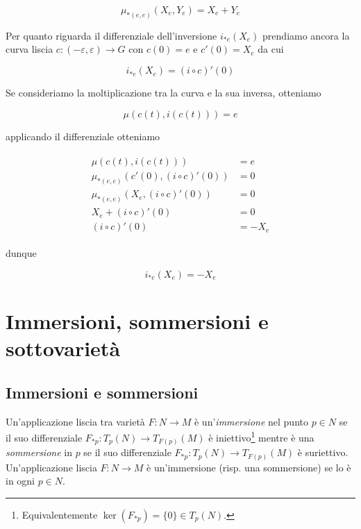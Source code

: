 \begin{equation}
	\mu_{*(e,e)}(X_{e},Y_{e}) = X_{e} + Y_{e}
\end{equation}

Per quanto riguarda il differenziale dell'inversione $ i_{*e}(X_{e}) $ prendiamo ancora la curva liscia $ c : (-\varepsilon,\varepsilon) \to G $ con $ c(0)=e $ e $ c'(0) = X_{e} $ da cui

\begin{equation}
	i_{*e}(X_{e}) = (i \circ c)'(0)
\end{equation}

Se consideriamo la moltiplicazione tra la curva e la sua inversa, otteniamo

\begin{equation}
	\mu(c(t),i(c(t))) = e
\end{equation}

applicando il differenziale otteniamo

\begin{align}
	\begin{split}
		\mu(c(t),i(c(t))) &= e\\
		\mu_{*(e,e)}(c'(0),(i \circ c)'(0)) &= 0\\
		\mu_{*(e,e)}(X_{e},(i \circ c)'(0)) &= 0\\
		X_{e} + (i \circ c)'(0) &= 0\\
		(i \circ c)'(0) &= - X_{e}
	\end{split}
\end{align}

dunque

\begin{equation}
	i_{*e}(X_{e}) = - X_{e}
\end{equation}

\section{Immersioni, sommersioni e sottovarietà}

\subsection{Immersioni e sommersioni}

Un'applicazione liscia tra varietà $ F : N \to M $ è un'\textit{immersione} nel punto $ p \in N $ se il suo differenziale $ F_{*p} : T_{p}(N) \to T_{F(p)}(M) $ è iniettivo\footnote{%
	Equivalentemente $ \ker(F_{*p}) = \{0\} \in T_{p}(N) $.%
} mentre è una \textit{sommersione} in $ p $ se il suo differenziale $ F_{*p} : T_{p}(N) \to T_{F(p)}(M) $ è suriettivo.\\
Un'applicazione liscia $ F : N \to M $ è un'immersione (risp. una sommersione) se lo è in ogni $ p \in N $.

